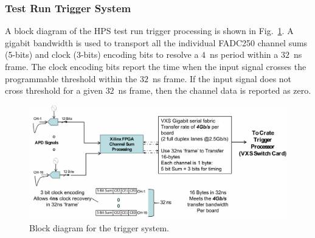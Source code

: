 \subsubsection{Test Run Trigger System}
\label{sec:testrun_trigger}

A block diagram of the HPS test run trigger processing is shown in Fig.~\ref{fig:trigger_diagram}.  A gigabit bandwidth is used to transport all the individual FADC250 channel sums (5-bits) and clock (3-bits) encoding bits to resolve a $4$~ns period within a $32$~ns frame.  The clock encoding bits report the time when the input signal crosses the programmable threshold within the $32$~ns frame.  If the input signal does not cross threshold for a given $32$~ns frame, then the channel data is reported as zero.
\begin{figure}[t]
\includegraphics[scale=0.6]{test2012/trigger/HPSChanSum_001.jpg}
\caption{\small{Block diagram for the trigger system.}}\label{fig:trigger_diagram}
\end{figure}

